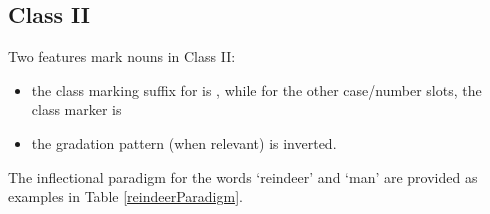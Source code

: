 \FB




\subsection{Class II}\label{NclassII}
Two features mark nouns in Class II: 
\begin{itemize}
\item{the class marking suffix for  is , while for the other case/number slots, the class marker is }
\item{the gradation pattern (when relevant) is inverted.}
\end{itemize}
The inflectional paradigm for the words  ‘reindeer’ and  ‘man’ are provided as examples in Table \vref{reindeerParadigm}.


